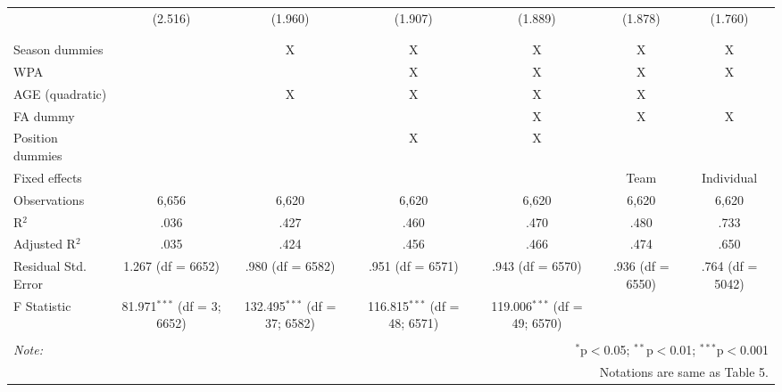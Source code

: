 \begin{table}[H]
\begin{tabular}{@{\extracolsep{5pt}}lcccccc}
  & (2.516) & (1.960) & (1.907) & (1.889) & (1.878) & (1.760) \\
  & & & & & & \\
\hline \\[-1.8ex]
Season dummies &  & X & X & X & X & X \\
WPA & & & X & X & X & X  \\
AGE (quadratic) &  & X & X & X & X &  \\
FA dummy &  &  &  & X & X & X \\
Position dummies &  &  & X & X &  &  \\
Fixed effects &  &  &  &  & Team & Individual \\
Observations & 6,656 & 6,620 & 6,620 & 6,620 & 6,620 & 6,620 \\
R$^{2}$ & .036 & .427 & .460 & .470 & .480 & .733 \\
Adjusted R$^{2}$ & .035 & .424 & .456 & .466 & .474 & .650 \\
Residual Std. Error & 1.267 (df = 6652) & .980 (df = 6582) & .951 (df = 6571) & .943 (df = 6570) & .936 (df = 6550) & .764 (df = 5042) \\
F Statistic & 81.971$^{***}$ (df = 3; 6652) & 132.495$^{***}$ (df = 37; 6582) & 116.815$^{***}$ (df = 48; 6571) & 119.006$^{***}$ (df = 49; 6570) &  &  \\
\hline
\hline \\[-1.8ex]
\textit{Note:}  & \multicolumn{6}{r}{$^{*}$p$<$0.05; $^{**}$p$<$0.01; $^{***}$p$<$0.001} \\
& \multicolumn{6}{r}{Notations are same as Table 5.} \\
\end{tabular}
\end{table}

